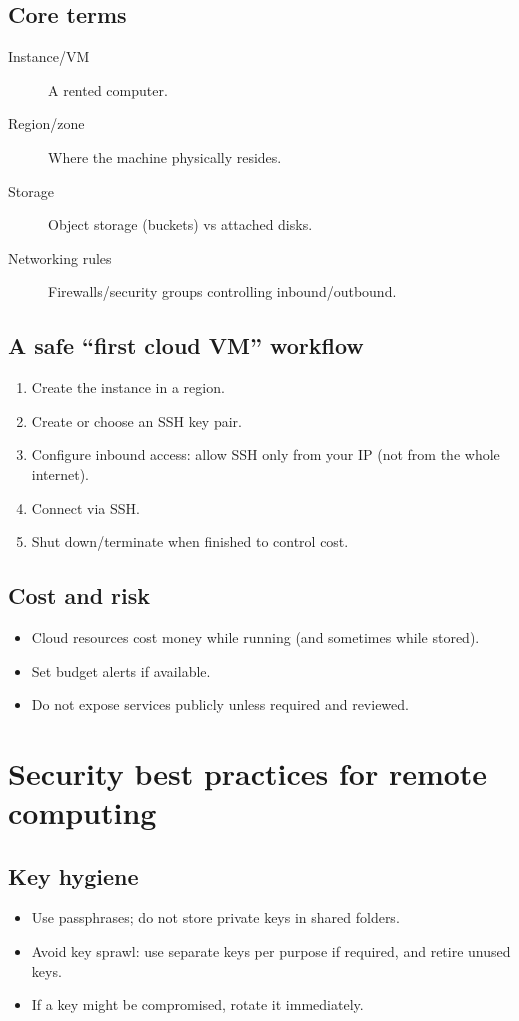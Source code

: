 \subsection{Core terms}
\begin{description}
\item[Instance/VM] A rented computer.
\item[Region/zone] Where the machine physically resides.
\item[Storage] Object storage (buckets) vs attached disks.
\item[Networking rules] Firewalls/security groups controlling inbound/outbound.
\end{description}

\subsection{A safe ``first cloud VM'' workflow}
\begin{enumerate}
\item Create the instance in a region.
\item Create or choose an SSH key pair.
\item Configure inbound access: allow SSH only from your IP (not from the whole internet).
\item Connect via SSH.
\item Shut down/terminate when finished to control cost.
\end{enumerate}

\subsection{Cost and risk}
\begin{itemize}
\item Cloud resources cost money while running (and sometimes while stored).
\item Set budget alerts if available.
\item Do not expose services publicly unless required and reviewed.
\end{itemize}

\section{Security best practices for remote computing}
\subsection{Key hygiene}
\begin{itemize}
\item Use passphrases; do not store private keys in shared folders.
\item Avoid key sprawl: use separate keys per purpose if required, and retire unused keys.
\item If a key might be compromised, rotate it immediately.
\end{itemize}

